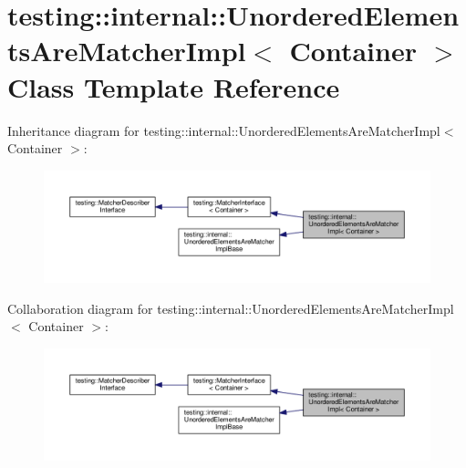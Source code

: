 \hypertarget{classtesting_1_1internal_1_1UnorderedElementsAreMatcherImpl}{}\section{testing\+:\+:internal\+:\+:Unordered\+Elements\+Are\+Matcher\+Impl$<$ Container $>$ Class Template Reference}
\label{classtesting_1_1internal_1_1UnorderedElementsAreMatcherImpl}


Inheritance diagram for testing\+:\+:internal\+:\+:Unordered\+Elements\+Are\+Matcher\+Impl$<$ Container $>$\+:\nopagebreak
\begin{figure}[H]
\begin{center}
\leavevmode
\includegraphics[width=350pt]{classtesting_1_1internal_1_1UnorderedElementsAreMatcherImpl__inherit__graph}
\end{center}
\end{figure}


Collaboration diagram for testing\+:\+:internal\+:\+:Unordered\+Elements\+Are\+Matcher\+Impl$<$ Container $>$\+:\nopagebreak
\begin{figure}[H]
\begin{center}
\leavevmode
\includegraphics[width=350pt]{classtesting_1_1internal_1_1UnorderedElementsAreMatcherImpl__coll__graph}
\end{center}
\end{figure}

